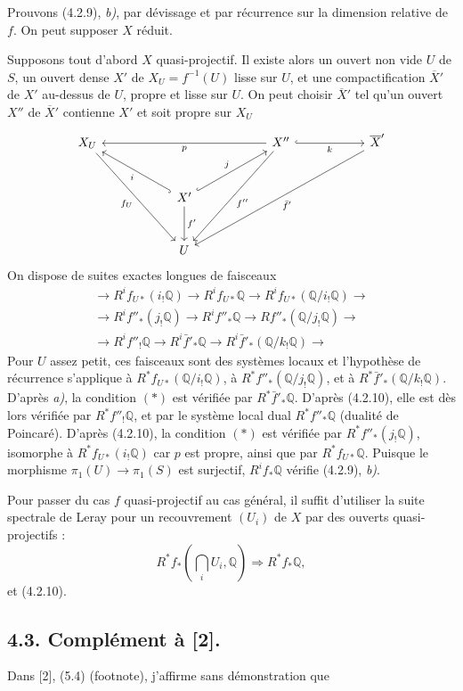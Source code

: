 \documentclass[10pt]{article}
\newcommand{\Q}{\mathbb Q}
\begin{document}
Prouvons (4.2.9), \textit{b)}, par dévissage et par récurrence sur la dimension relative de $f$. On peut supposer $X$ réduit.

Supposons tout d'abord $X$ quasi-projectif. Il existe alors un ouvert non vide $U$ de $S$, un ouvert dense $X'$ de $X_U=f^{-1}(U)$ lisse sur $U$, et une compactification $\overline X'$ de $X'$ au-dessus de $U$, propre et lisse sur $U$. On peut choisir $\overline X'$ tel qu'un ouvert $X''$ de $\overline X'$ contienne $X'$ et soit propre sur $X_U$
\[
\begin{tikzcd}[column sep=2.8em,row sep=2.8em]
X_U \arrow[ddrr,"f_U"'] &&&&
X'' \arrow[llll,"p"] \arrow[rr,hook,"k"'] \arrow[ddll,"f''"] &&
\overline X' \arrow[ddllll,"\bar f'"] \\
&& X' \arrow[ull,hook,"i"] \arrow[urr,hook,"j"] \arrow[d,"f'"] &&&& \\
&& U &&&&
\end{tikzcd}
\]
On dispose de suites exactes longues de faisceaux
\[
\begin{gathered}
\to R^if_{U*}(i_!\Q)\to R^if_{U*}\Q\to R^if_{U*}(\Q/i_!\Q)\to\\
\to R^if''_*(j_!\Q)\to R^if''_*\Q\to Rf''_*(\Q/j_!\Q)\to\\
\to R^if''_!\Q\to R^i\bar f'_*\Q\to R^i\bar f'_*(\Q/k_!\Q)\to
\end{gathered}
\]
Pour $U$ assez petit, ces faisceaux sont des systèmes locaux et l'hypothèse de récurrence s'applique à $R^*f_{U*}(\Q/i_!\Q)$, à $R^*f''_*(\Q/j_!\Q)$, et à $R^*\bar f'_*(\Q/k_!\Q)$. D'après \textit{a)}, la condition $(*)$ est vérifiée par $R^*\bar f'_*\Q$. D'après (4.2.10), elle est dès lors vérifiée par $R^*f''_!\Q$, et par le système local dual $R^*f''_*\Q$ (dualité de Poincaré). D'après (4.2.10), la condition $(*)$ est vérifiée par $R^*f''_*(j_!\Q)$, isomorphe à $R^*f_{U*}(i_!\Q)$ car $p$ est propre, ainsi que par $R^*f_{U*}\Q$. Puisque le morphisme $\pi_1(U)\to\pi_1(S)$ est surjectif, $R^if_*\Q$ vérifie (4.2.9), \textit{b)}.

Pour passer du cas $f$ quasi-projectif au cas général, il suffit d'utiliser la suite spectrale de Leray pour un recouvrement $(U_i)$ de $X$ par des ouverts quasi-projectifs :
\[
R^*f_*(\bigcap_iU_i,\Q)\Rightarrow R^*f_*\Q,
\]
et (4.2.10).

\subsection*{4.3. Complément à [2].}

Dans [2], (5.4) (footnote), j'affirme sans démonstration que
\end{document}
